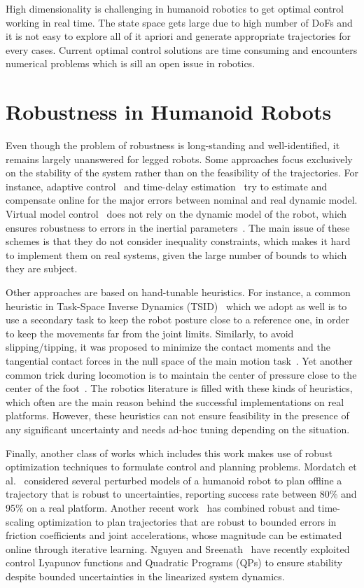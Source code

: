 High dimensionality is challenging in humanoid robotics to get optimal control working in real time. The state space gets large due to high number of DoFs and it is not easy to explore all of it apriori and generate appropriate trajectories for every cases. Current optimal control solutions are time consuming and encounters numerical problems which is sill an open issue in robotics.

\section{Robustness in Humanoid Robots}
\label{sec:soa_robust}
Even though the problem of robustness is long-standing and well-identified, it remains largely unanswered for legged robots. 
Some approaches focus exclusively on the stability of the system rather than on the feasibility of the trajectories.
For instance, adaptive control~\cite{Kelly1989} and time-delay estimation~\cite{Jin2008} try to estimate and compensate online for the major errors between nominal and real dynamic model.
Virtual model control~\cite{Pratt} does not rely on the dynamic model of the robot, which ensures robustness to errors in the inertial parameters~\cite{dietrich2013multi}. 
The main issue of these schemes is that they do not consider inequality constraints, which makes it hard to implement them on real systems, given the large number of bounds to which they are subject.

Other approaches are based on hand-tunable heuristics. For instance, a common heuristic in Task-Space Inverse Dynamics (TSID)~\cite{DelPrete2014c} which we adopt as well is to use a secondary task to keep the robot posture close to a reference one, in order to keep the movements far from the joint limits. 
Similarly, to avoid slipping/tipping, it was proposed to minimize the contact moments and the tangential contact forces in the null space of the main motion task~\cite{Righetti2010}. 
Yet another common trick during locomotion is to maintain the center of pressure close to the center of the foot~\cite{Kajita2003}.
The robotics literature is filled with these kinds of heuristics, which often are the main reason behind the successful implementations on real platforms.
However, these heuristics can not ensure feasibility in the presence of any significant uncertainty and needs ad-hoc tuning depending on the situation.

Finally, another class of works which includes this work makes use of robust optimization techniques to formulate control and planning problems.
Mordatch et al.~\cite{Mordatch2015} considered several perturbed models of a humanoid robot to plan offline a trajectory that is robust to uncertainties, reporting success rate between 80\% and 95\% on a real platform. 
Another recent work~\cite{Luo} has combined robust and time-scaling optimization to plan trajectories that are robust to bounded errors in friction coefficients and joint accelerations, whose magnitude can be estimated online through iterative learning.
Nguyen and Sreenath~\cite{Nguyen} have recently exploited control Lyapunov functions and Quadratic Programs (QPs) to ensure stability despite bounded uncertainties in the linearized system dynamics. 

